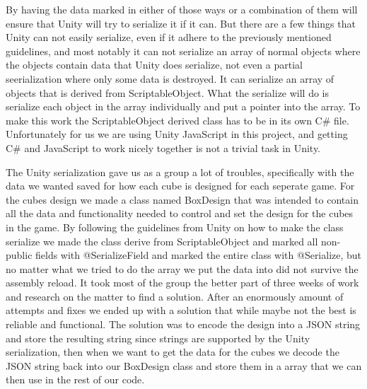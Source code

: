 By having the data marked in either of those ways or a combination of them will ensure that Unity will try to serialize it if it can.
But there are a few things that Unity can not easily serialize, even if it adhere to the previously mentioned guidelines, and most notably it can not serialize an array of normal objects where the objects contain data that Unity does serialize, not even a partial seerialization where only some data is destroyed.
It can serialize an array of objects that is derived from ScriptableObject. What the serialize will do is serialize each object in the
array individually and put a pointer into the array. To make this work the ScriptableObject derived class has to be in its own
C# file.
Unfortunately for us we are using Unity JavaScript in this project, and getting C# and JavaScript to work nicely
together is not a trivial task in Unity.

The Unity serialization gave us as a group a lot of troubles, specifically with the data we wanted saved for how each cube is designed for each seperate game.
For the cubes design we made a class named BoxDesign that was intended to contain all the data and functionality needed to control and set the design for the cubes in the game.
By following the guidelines from Unity on how to make the class serialize we made the class derive from ScriptableObject and marked all non-public fields with @SerializeField and marked the entire class with @Serialize, but no matter what we tried to do the array we put the data into did not survive the assembly reload.
It took most of the group the better part of three weeks of work and research on the matter to find a solution.
 After an enormously amount of attempts and fixes we ended up with a solution that while maybe not the best is reliable and functional. The solution was to encode the design into a JSON string and store the resulting string since strings are supported by the Unity serialization, then when we want to get the data for the cubes we decode the JSON string back into our BoxDesign class and store them in a array that we can then use in the rest of our code.
 